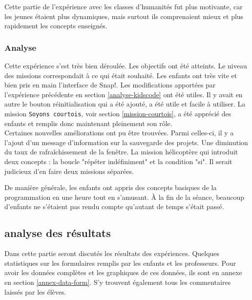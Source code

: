 Cette partie de l'expérience avec les classes d'humanités fut plus motivante, car les jeunes étaient plus dynamiques, mais surtout ils comprenaient mieux et plus rapidement les concepts enseignés.  %

\subsubsection{Analyse}
\label{analyse-scienceinfuse}
Cette expérience s'est très bien déroulée. Les objectifs ont été atteints. Le niveau des missions correspondait à ce qui était souhaité. Les enfants ont très vite et bien pris en main l'interface de Snap!. Les modifications apportées par l'expérience précédente en section \ref{analyse-kidscode} ont été utiles. Il y avait en autre le bouton réinitialisation qui a été ajouté, a été utile et facile à utiliser. La mission \texttt{Soyons courtois}, voir section \ref{mission-courtois}, a été apprécié des enfants et remplis donc maintenant pleinement son rôle.\\ %

Certaines nouvelles améliorations ont pu être trouvées. Parmi celles-ci, il y a l'ajout d'un message d'information sur la sauvegarde des projets. Une diminution du taux de rafraîchissement de la fenêtre. La mission hélicoptère qui introduit deux concepts : la boucle "répéter indéfiniment" et la condition "si". Il serait judicieux d'en faire deux missions séparées.

De manière générale, les enfants ont appris des concepts basiques de la programmation en une heure tout en s'amusant. À la fin de la séance, beaucoup d'enfants ne s'étaient pas rendu compte qu'autant de temps s'était passé.
\subsection{analyse des résultats}
\label{analyse-exp}
Dans cette partie seront discutés les résultats des expériences. Quelques statistiques sur les formulaires remplis par les enfants et les professeurs. Pour avoir les données complètes et les graphiques de ces données, ils sont en annexe en section \ref{annex-data-form}. S'y trouvent également tous les commentaires laissés par les élèves.

